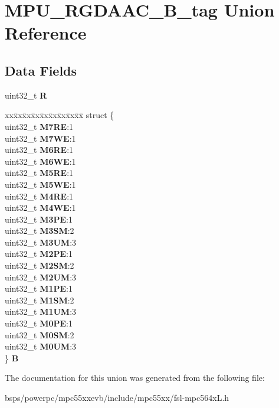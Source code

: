 \hypertarget{unionMPU__RGDAAC__32B__tag}{}\section{M\+P\+U\+\_\+\+R\+G\+D\+A\+A\+C\+\_\+B\+\_\+tag Union Reference}
\label{unionMPU__RGDAAC__32B__tag}
\subsection*{Data Fields}
\begin{DoxyCompactItemize}
\item 
\mbox{\label{unionMPU__RGDAAC__32B__tag_a3509103501e97600e332c2bc95382710}} 
uint32\+\_\+t {\bfseries R}
\item 
\mbox{\label{unionMPU__RGDAAC__32B__tag_a1cbadbfc34bbb609da4d4a2b65640be5}} 
\begin{tabbing}
xx\=xx\=xx\=xx\=xx\=xx\=xx\=xx\=xx\=\kill
struct \{\\
\>uint32\_t {\bfseries M7RE}:1\\
\>uint32\_t {\bfseries M7WE}:1\\
\>uint32\_t {\bfseries M6RE}:1\\
\>uint32\_t {\bfseries M6WE}:1\\
\>uint32\_t {\bfseries M5RE}:1\\
\>uint32\_t {\bfseries M5WE}:1\\
\>uint32\_t {\bfseries M4RE}:1\\
\>uint32\_t {\bfseries M4WE}:1\\
\>uint32\_t {\bfseries M3PE}:1\\
\>uint32\_t {\bfseries M3SM}:2\\
\>uint32\_t {\bfseries M3UM}:3\\
\>uint32\_t {\bfseries M2PE}:1\\
\>uint32\_t {\bfseries M2SM}:2\\
\>uint32\_t {\bfseries M2UM}:3\\
\>uint32\_t {\bfseries M1PE}:1\\
\>uint32\_t {\bfseries M1SM}:2\\
\>uint32\_t {\bfseries M1UM}:3\\
\>uint32\_t {\bfseries M0PE}:1\\
\>uint32\_t {\bfseries M0SM}:2\\
\>uint32\_t {\bfseries M0UM}:3\\
\} {\bfseries B}\\

\end{tabbing}\end{DoxyCompactItemize}


The documentation for this union was generated from the following file\+:\begin{DoxyCompactItemize}
\item 
bsps/powerpc/mpc55xxevb/include/mpc55xx/fsl-\/mpc564x\+L.\+h\end{DoxyCompactItemize}
